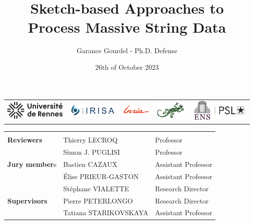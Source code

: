 \documentclass[aspectratio=169]{beamer}
\title{Sketch-based Approaches to Process Massive String Data}
\author{Garance Gourdel - Ph.D. Defense}
\date{26th of October 2023}
\begin{document}
\begin{frame}

  \titlepage
  \begin{center}
  \begin{tabular}{ccccc}
    \includegraphics[width=3cm]{logos/01_UNIRENNES.png}&
    \includegraphics[width=2.5cm]{logos/02_IRISA.png}&
    \includegraphics[width=1.5cm]{logos/03_inria.png}&
    \includegraphics[width=1.5cm]{logos/03b_logo_genscale.png}&
    \includegraphics[width=3cm]{logos/05_EN_horiz.jpg}
  \end{tabular}
  \medskip
  \small
  \begin{tabular}{l l l}
  \arrayrulecolor{gray}\hline \\
    \textbf{Reviewers}  &   Thierry LECROQ	&   Professor \\
                        & Simon J. PUGLISI	&    Professor\\
    \textbf{Jury member}s    & Bastien CAZAUX & Assistant Professor\\
                    & Élise PRIEUR-GASTON & Assistant Professor\\
                    & Stéphane VIALETTE	 & Research Director\\
    \textbf{Supervisors}     & Pierre PETERLONGO	& Research Director\\
                    & Tatiana STARIKOVSKAYA	& Assistant Professor\\
  \end{tabular}
  \end{center}
  \vfill
\end{frame}
\end{document}
